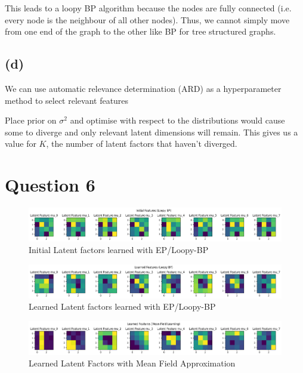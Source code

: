 \documentclass[12pt]{article}
\begin{document}
This leads to a loopy BP algorithm because the nodes are fully connected (i.e. every node is the neighbour of all other nodes). Thus, we cannot simply move from one end of the graph to the other like BP for tree structured graphs.

\subsection*{(d)}

We can use automatic relevance determination (ARD) as a hyperparameter method to select relevant features

Place prior on $\sigma^2$ and optimise with respect to the distributions would cause some to diverge and only relevant latent dimensions will remain.
This gives us a value for $K$, the number of latent factors that haven't diverged.


\newpage
\section*{Question 6}

\begin{figure}[h]
\centering
\includegraphics[scale=0.4]{outputs/q6/all-init-latent-factors}
\caption{Initial Latent factors learned with EP/Loopy-BP}
\label{fig:6-init-latent-factors}
\end{figure}

\begin{figure}[h]
\centering
\includegraphics[scale=0.4]{outputs/q6/all-latent-factors}
\caption{Learned Latent factors learned with EP/Loopy-BP}
\label{fig:6-latent-factors}
\end{figure}

\begin{figure}[h]
\centering
\includegraphics[scale=0.4]{outputs/q3/f-latent-factors}
\caption{Learned Latent Factors with Mean Field Approximation}
\label{fig:3f-latent-factors}
\end{figure}
\end{document}
